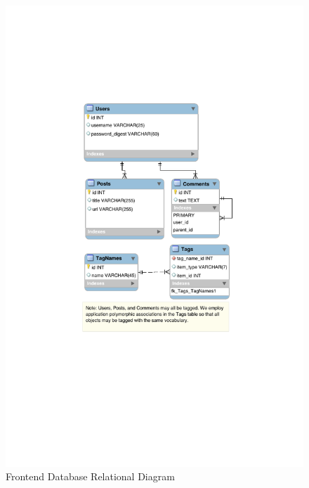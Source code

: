 \documentclass[11pt,letterpaper]{article}
\begin{document}
\begin{figure}
\centering
\includegraphics{db_diagram.pdf}
\caption{Frontend Database Relational Diagram}
\label{fig:database}
\end{figure}

\end{document}
